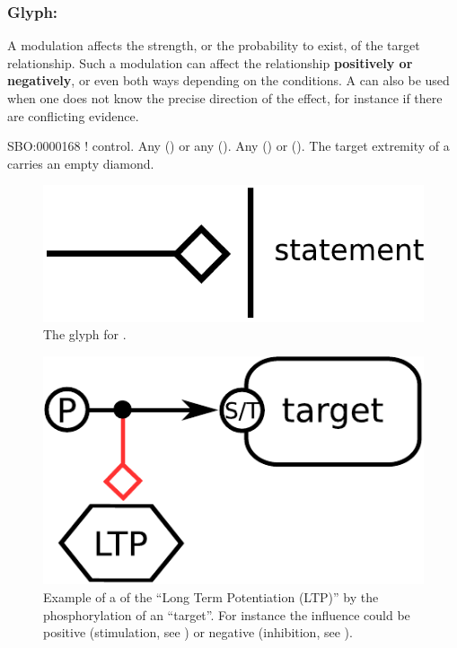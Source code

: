 \color{blue}
\subsubsection{Glyph: }\label{sec:modulation}

A modulation affects the strength, or the probability to exist, of the target relationship. Such a modulation can affect the relationship \textbf{positively or negatively}, or even both ways depending on the conditions. A  can also be used when one does not know the precise direction of the effect, for instance if there are conflicting evidence.

\begin{glyphDescription}
 \glyphSboTerm SBO:0000168 ! control.
 \glyphOrigin Any  () or any  ().
 \glyphTarget Any  () or  ().
 \glyphEndPoint The target extremity of a  carries an empty diamond.
 \end{glyphDescription}

\begin{figure}[H]
  \centering
  \includegraphics[scale = 0.3]{images/modulation}
  \caption{The \ER glyph for .}
  \label{fig:modulation}
\end{figure}
 
\begin{figure}[H]
  \centering
  \includegraphics[scale = 0.5]{examples/ex-modulation}
  \caption{Example of a  of the  ``Long Term Potentiation (LTP)'' by the phosphorylation of an  ``target''. For instance the influence could be positive (stimulation, see ) or negative (inhibition, see ).}
  \label{fig:ex-modulation}
\end{figure}

\normalcolor

